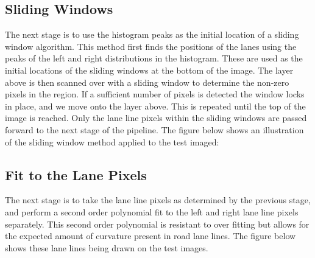 \documentclass[letterpaper,12pt]{article}
\begin{document}
\subsection{Sliding Windows}
The next stage is to use the histogram peaks as the initial location of a sliding window algorithm.  This method first finds the positions of the lanes using the peaks of the left and right distributions in the histogram. These are used as the initial locations of the sliding windows at the bottom of the image. The layer above is then scanned over with a sliding window to determine the non-zero pixels in the region. If a sufficient number of pixels is detected the window locks in place, and we move onto the layer above. This is repeated until the top of the image is reached. Only the lane line pixels within the sliding windows are passed forward to the next stage of the pipeline. The figure below shows an illustration of the sliding window method applied to the test imaged:
\FloatBarrier
\begin{figure}
\centering
{}
\end{figure}
\FloatBarrier
\subsection{Fit to the Lane Pixels}
The next stage is to take the lane line pixels as determined by the previous stage, and perform a second order polynomial fit to the left and right lane line pixels separately. This second order polynomial is resistant to over fitting but allows for the expected amount of curvature present in road lane lines. The figure below shows these lane lines being drawn on the test images.
\FloatBarrier
\begin{figure}
\centering
{}
\end{figure}
\FloatBarrier
\end{document}
